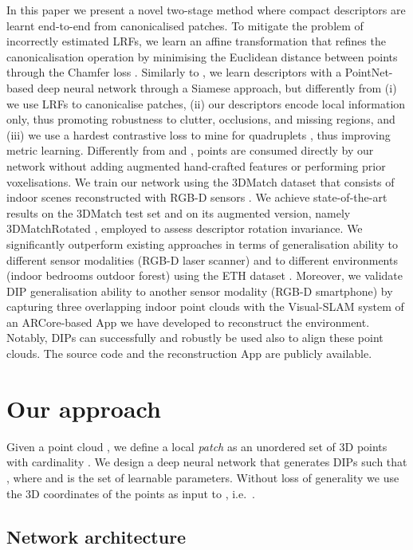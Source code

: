 \documentclass[a4paper,conference]{IEEEtran}
\begin{document}
In this paper we present a novel two-stage method where compact descriptors are learnt end-to-end from canonicalised patches.
To mitigate the problem of incorrectly estimated LRFs, we learn an affine transformation that refines the canonicalisation operation by minimising the Euclidean distance between points through the Chamfer loss \cite{Zhao2019}.
Similarly to \cite{Deng2018cvpr}, we learn descriptors with a PointNet-based deep neural network through a Siamese approach, but differently from \cite{Deng2018cvpr} 
(i) we use LRFs to canonicalise patches, 
(ii) our descriptors encode local information only, thus promoting robustness to clutter, occlusions, and missing regions, and
(iii) we use a hardest contrastive loss to mine for quadruplets \cite{Choy2019}, thus improving metric learning.
Differently from \cite{Deng2018cvpr} and \cite{Gojcic2019}, points are consumed directly by our network without adding augmented hand-crafted features or performing prior voxelisations.
We train our network using the 3DMatch dataset that consists of indoor scenes reconstructed with RGB-D sensors \cite{Zeng2017}.
We achieve state-of-the-art results on the 3DMatch test set and on its augmented version, namely 3DMatchRotated \cite{Deng2018eccv}, employed to assess descriptor rotation invariance.
We significantly outperform existing approaches in terms of generalisation ability to different sensor modalities (RGB-D  laser scanner) and to different environments (indoor bedrooms  outdoor forest) using the ETH dataset \cite{Pomerleau2012}.
Moreover, we validate DIP generalisation ability to another sensor modality (RGB-D  smartphone) by capturing three overlapping indoor point clouds with the Visual-SLAM system \cite{Mur-Artal2015} of an ARCore-based App \cite{arcore} we have developed to reconstruct the environment.
Notably, DIPs can successfully and robustly be used also to align these point clouds.
The source code and the reconstruction App are publicly available. 
\section{Our approach}

Given a point cloud , we define a local \emph{patch}  as an unordered set of 3D points  with cardinality .
We design a deep neural network  that generates DIPs such that , where  and  is the set of learnable parameters.
Without loss of generality we use the 3D coordinates of the points as input to , i.e.~.

\subsection{Network architecture}
\end{document}
